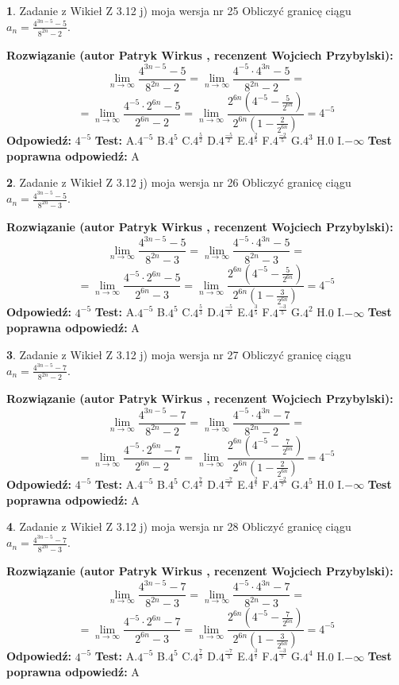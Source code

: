 \documentclass[12pt, a4paper]{article}
\theoremstyle{definition} %
\newtheorem{zad}{}
\newcommand{\zadStart}[1]{\begin{zad}#1\newline}
\newcommand{\zadStop}{\end{zad}}
\newcommand{\rozwStart}[2]{\noindent \textbf{Rozwiązanie (autor #1 , recenzent #2): }\newline}
\newcommand{\rozwStop}{\newline}
\newcommand{\odpStart}{\noindent \textbf{Odpowiedź:}\newline}
\newcommand{\odpStop}{\newline}
\newcommand{\testStart}{\noindent \textbf{Test:}\newline}
\newcommand{\testStop}{\newline}
\newcommand{\kluczStart}{\noindent \textbf{Test poprawna odpowiedź:}\newline}
\newcommand{\kluczStop}{\newline}
\begin{document}
\zadStart{Zadanie z Wikieł Z 3.12 j) moja wersja nr 25}
Obliczyć granicę ciągu $a_{n}=\frac{4^{3n-5}-5}{8^{2n}-2}$.
\zadStop
\rozwStart{Patryk Wirkus}{Wojciech Przybylski}
$$\lim\limits_{n\to\infty}\frac{4^{3n-5}-5}{8^{2n}-2}= \lim\limits_{n\to\infty}\frac{4^{-5} \cdot 4^{3n}-5}{8^{2n}-2}=$$
$$= \lim\limits_{n\to\infty}\frac{4^{-5} \cdot 2^{6n}-5}{2^{6n}-2}= \lim\limits_{n\to\infty}\frac{2^{6n}(4^{-5} - \frac{5}{2^{6n}})}{2^{6n}(1-\frac{2}{2^{6n}})}= 4^{-5}$$
\rozwStop
\odpStart
$4^{-5}$
\odpStop
\testStart
A.$4^{-5}$
B.$4^{5}$
C.$4^{\frac{5}{2}}$
D.$4^{\frac{-5}{2}}$
E.$4^{\frac{2}{5}}$
F.$4^{\frac{-2}{5}}$
G.$4^{3}$
H.$0$
I.$-\infty$
\testStop
\kluczStart
A
\kluczStop



\zadStart{Zadanie z Wikieł Z 3.12 j) moja wersja nr 26}
Obliczyć granicę ciągu $a_{n}=\frac{4^{3n-5}-5}{8^{2n}-3}$.
\zadStop
\rozwStart{Patryk Wirkus}{Wojciech Przybylski}
$$\lim\limits_{n\to\infty}\frac{4^{3n-5}-5}{8^{2n}-3}= \lim\limits_{n\to\infty}\frac{4^{-5} \cdot 4^{3n}-5}{8^{2n}-3}=$$
$$= \lim\limits_{n\to\infty}\frac{4^{-5} \cdot 2^{6n}-5}{2^{6n}-3}= \lim\limits_{n\to\infty}\frac{2^{6n}(4^{-5} - \frac{5}{2^{6n}})}{2^{6n}(1-\frac{3}{2^{6n}})}= 4^{-5}$$
\rozwStop
\odpStart
$4^{-5}$
\odpStop
\testStart
A.$4^{-5}$
B.$4^{5}$
C.$4^{\frac{5}{3}}$
D.$4^{\frac{-5}{3}}$
E.$4^{\frac{3}{5}}$
F.$4^{\frac{-3}{5}}$
G.$4^{2}$
H.$0$
I.$-\infty$
\testStop
\kluczStart
A
\kluczStop



\zadStart{Zadanie z Wikieł Z 3.12 j) moja wersja nr 27}
Obliczyć granicę ciągu $a_{n}=\frac{4^{3n-5}-7}{8^{2n}-2}$.
\zadStop
\rozwStart{Patryk Wirkus}{Wojciech Przybylski}
$$\lim\limits_{n\to\infty}\frac{4^{3n-5}-7}{8^{2n}-2}= \lim\limits_{n\to\infty}\frac{4^{-5} \cdot 4^{3n}-7}{8^{2n}-2}=$$
$$= \lim\limits_{n\to\infty}\frac{4^{-5} \cdot 2^{6n}-7}{2^{6n}-2}= \lim\limits_{n\to\infty}\frac{2^{6n}(4^{-5} - \frac{7}{2^{6n}})}{2^{6n}(1-\frac{2}{2^{6n}})}= 4^{-5}$$
\rozwStop
\odpStart
$4^{-5}$
\odpStop
\testStart
A.$4^{-5}$
B.$4^{5}$
C.$4^{\frac{7}{2}}$
D.$4^{\frac{-7}{2}}$
E.$4^{\frac{2}{7}}$
F.$4^{\frac{-2}{7}}$
G.$4^{5}$
H.$0$
I.$-\infty$
\testStop
\kluczStart
A
\kluczStop



\zadStart{Zadanie z Wikieł Z 3.12 j) moja wersja nr 28}
Obliczyć granicę ciągu $a_{n}=\frac{4^{3n-5}-7}{8^{2n}-3}$.
\zadStop
\rozwStart{Patryk Wirkus}{Wojciech Przybylski}
$$\lim\limits_{n\to\infty}\frac{4^{3n-5}-7}{8^{2n}-3}= \lim\limits_{n\to\infty}\frac{4^{-5} \cdot 4^{3n}-7}{8^{2n}-3}=$$
$$= \lim\limits_{n\to\infty}\frac{4^{-5} \cdot 2^{6n}-7}{2^{6n}-3}= \lim\limits_{n\to\infty}\frac{2^{6n}(4^{-5} - \frac{7}{2^{6n}})}{2^{6n}(1-\frac{3}{2^{6n}})}= 4^{-5}$$
\rozwStop
\odpStart
$4^{-5}$
\odpStop
\testStart
A.$4^{-5}$
B.$4^{5}$
C.$4^{\frac{7}{3}}$
D.$4^{\frac{-7}{3}}$
E.$4^{\frac{3}{7}}$
F.$4^{\frac{-3}{7}}$
G.$4^{4}$
H.$0$
I.$-\infty$
\testStop
\kluczStart
A
\kluczStop
\end{document}
